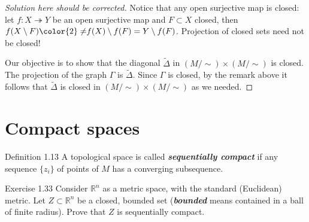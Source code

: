 \begin{proof}[{\color{2}Solution here should be corrected}]\leavevmode
Notice that any open surjective map is closed: let $f:X \twoheadrightarrow Y$ be an open surjective map and $F\subset X$ closed, then $f(X\setminus F){\color{2}\neq }f(X)\setminus f(F)=Y\setminus f(F)$. {\color{2}Projection of closed sets need not be closed!}

Our objective is to show that the diagonal $\tilde{\Delta}$ in $(M/\sim)\times(M/\sim)$ is closed. The projection of the graph $\Gamma$ is $\tilde{\Delta}$. Since $\Gamma$ is closed, by the remark above it follows that $\tilde{\Delta}$ is closed in $(M/\sim)\times(M/\sim)$ as we needed.
\end{proof}
\fi
\section{Compact spaces}

\begin{thing3}{Definition 1.13}\leavevmode
	A topological space is called \textit{\textbf{sequentially compact}} if any sequence $\{z_i\}$ of points of $M$ has a converging subsequence.
\end{thing3}


\begin{thing4}{Exercise 1.33}\label{exer:1.33}\leavevmode
Consider $\mathbb{R}^n$ as a metric space, with the standard (Euclidean) metric. Let $Z \subset \mathbb{R}^n$ be a closed, bounded set (\textit{\textbf{bounded}} means contained in a ball of finite radius). Prove that $Z$ is sequentially compact.
\end{thing4}

